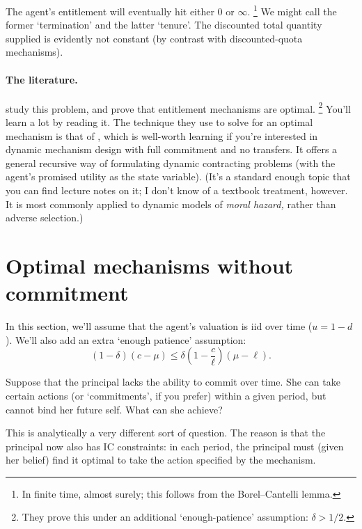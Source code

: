 The agent's entitlement will eventually hit either $0$ or $\infty$.%
	\footnote{In finite time, almost surely; this follows from the Borel--Cantelli lemma.}
We might call the former `termination'
and the latter `tenure'.
The discounted total quantity supplied is evidently not constant (by contrast with discounted-quota mechanisms).


\paragraph{The literature.}
\textcite{GuoHorner2020} study this problem, and prove that entitlement mechanisms are optimal.%
	\footnote{They prove this under an additional `enough-patience' assumption: $\delta > 1/2$.}
You'll learn a lot by reading it.
The technique they use to solve for an optimal mechanism is that of \textcite{SpearSrivastava1987}, which is well-worth learning if you're interested in dynamic mechanism design with full commitment and no transfers.
It offers a general recursive way of formulating dynamic contracting problems (with the agent's promised utility as the state variable).
(It's a standard enough topic that you can find lecture notes on it; I don't know of a textbook treatment, however. It is most commonly applied to dynamic models of \emph{moral hazard,} rather than adverse selection.)



\section{Optimal mechanisms without commitment}
\label{sec:ch3:nocommitment}

In this section, we'll assume that the agent's valuation is iid over time ($u = 1-d$).
We'll also add an extra `enough patience' assumption:
%
\begin{equation*}
	(1-\delta) (c-\mu)
	\leq \delta \left( 1 - \frac{c}{\ell} \right) \left( \mu - \ell \right) .
\end{equation*}

Suppose that the principal lacks the ability to commit over time.
She can take certain actions (or `commitments', if you prefer) within a given period, but cannot bind her future self.
What can she achieve?

This is analytically a very different sort of question. The reason is that the principal now also has IC constraints: in each period, the principal must (given her belief) find it optimal to take the action specified by the mechanism.


